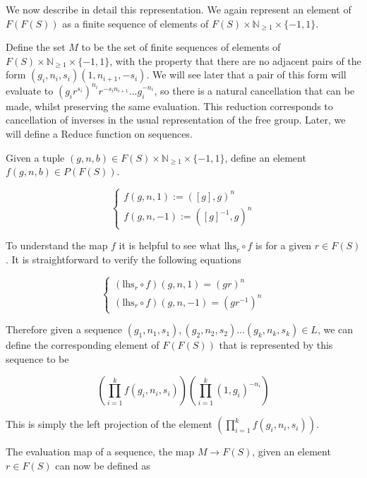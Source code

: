 \documentclass[12pt]{article} %
\theoremstyle{definition}
\theoremstyle{definition}
\theoremstyle{definition}
\theoremstyle{definition}
\begin{document}
We now describe in detail this representation. We again
represent an element of $F(F(S))$ as a finite sequence of elements of $F(S) \times \mathbb{N}_{\ge 1}
\times\{-1,1\}$.

Define the set $M$ to be the set of finite sequences of elements of
$F(S) \times \mathbb{N}_{\ge 1}
\times\{-1,1\}$, with the property that there are no adjacent pairs of the form
$(g_i, n_i, s_i)(1, n_{i+1}, -s_i)$. We will see later that a pair of this form will evaluate
to $(g_i r^{s_i})^{n_i}r^{-s_in_{i+1}} \dots g_i^{-n_i}$,
so there is a natural cancellation that can be made, whilst preserving the same
evaluation. This reduction corresponds to cancellation of inverses in
the usual representation of the free group. Later,
we will define a Reduce function on sequences.

Given a tuple $(g, n, b) \in F(S) \times \mathbb{N}_{\ge 1} \times\{-1,1\}$,
define an element $f(g, n, b) \in P(F(S))$.

\begin{equation}
  \begin{cases}
    f(g, n, 1) := ([g], g) ^ n \\
    f(g, n, -1) := ([g]^{-1}, g)^n
  \end{cases}
\end{equation}

To understand the map $f$ it is helpful to see what $\text{lhs}_r \circ f$ is for a given
$r \in F(S)$. It is straightforward to verify the following equations

\begin{equation}
  \begin{cases}
    (\text{lhs}_r \circ f)(g, n, 1) = (gr)^n \\
    (\text{lhs}_r \circ f)(g, n, -1) = (gr^{-1})^n
  \end{cases}
\end{equation}

Therefore given a sequence $(g_1, n_1, s_1), (g_2, n_2,s_2) \dots (g_k, n_k,s_k) \in L$,
we can define the corresponding element of $F(F(S))$ that is represented by this
sequence to be

\begin{equation}
    \left(\prod_{i=1}^k f(g_i, n_i, s_i)\right)\left(\prod_{i=1}^k (1, g_i)^{-n_i}\right)
\end{equation}

This is simply the left projection of the element $\left(\prod_{i=1}^k f(g_i, n_i, s_i)\right)$.

The evaluation map of a sequence, the map $M \to F(S)$, given an element $r \in F(S)$
can now be defined as
\end{document}
